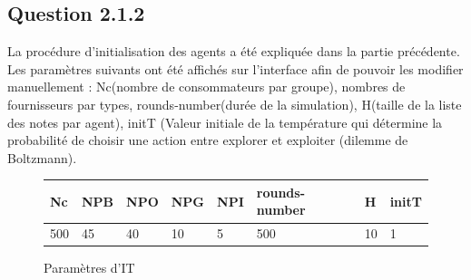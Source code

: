 
\subsection{Question 2.1.2}
La procédure d'initialisation des agents a été expliquée dans la partie précédente. 
Les paramètres suivants ont été affichés sur l'interface afin de pouvoir les modifier manuellement : Nc(nombre de consommateurs par groupe), nombres de fournisseurs par types, rounds-number(durée de la simulation), H(taille de la liste des notes par agent), initT (Valeur initiale de la température qui détermine la probabilité de choisir une action entre explorer et exploiter (dilemme de Boltzmann\cite{Dilemme}).

\begin{figure}[H]
\begin{center}
\begin{tabular}{|l|l|l|l|l|l|l|l|}
  \hline
  Nc & NPB & NPO & NPG & NPI & rounds-number & H & initT\\
  \hline
  500 & 45 & 40 & 10 & 5 & 500 & 10 & 1 \\
  \hline
\end{tabular}
\end{center}
\caption{Paramètres d'IT}
\end{figure}

